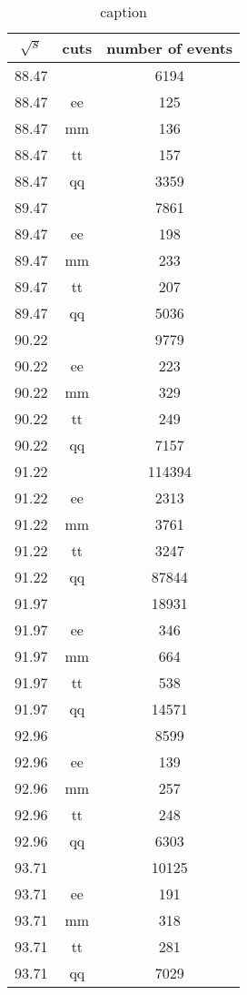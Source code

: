 \begin{table}[htpb]
	\centering
\begin{tabular}{ccc}
	\toprule
	$\sqrt{s}$ &  cuts &  number of events\\
	\midrule
\num{88.47} &   & \num{ 6194}\\
\num{88.47} &  ee & \num{ 125}\\
\num{88.47} &  mm & \num{ 136}\\
\num{88.47} &  tt & \num{ 157}\\
\num{88.47} &  qq & \num{ 3359}\\
\num{89.47} &   & \num{ 7861}\\
\num{89.47} &  ee & \num{ 198}\\
\num{89.47} &  mm & \num{ 233}\\
\num{89.47} &  tt & \num{ 207}\\
\num{89.47} &  qq & \num{ 5036}\\
\num{90.22} &   & \num{ 9779}\\
\num{90.22} &  ee & \num{ 223 }\\
\num{90.22} &  mm & \num{ 329}\\
\num{90.22} &  tt & \num{ 249}\\
\num{90.22} &  qq & \num{ 7157}\\
\num{91.22} &   & \num{ 114394}\\
\num{91.22} &  ee & \num{ 2313}\\
\num{91.22} &  mm & \num{ 3761}\\
\num{91.22} &  tt & \num{ 3247}\\
\num{91.22} &  qq & \num{ 87844}\\
\num{91.97} &   & \num{ 18931}\\
\num{91.97} &  ee & \num{ 346}\\
\num{91.97} &  mm & \num{ 664}\\
\num{91.97} &  tt & \num{ 538}\\
\num{91.97} &  qq & \num{ 14571}\\
\num{92.96} &   & \num{ 8599}\\
\num{92.96} &  ee & \num{ 139}\\
\num{92.96} &  mm & \num{ 257}\\
\num{92.96} &  tt & \num{ 248}\\
\num{92.96} &  qq & \num{ 6303}\\
\num{93.71} &   & \num{ 10125}\\
\num{93.71} &  ee & \num{ 191}\\
\num{93.71} &  mm & \num{ 318}\\
\num{93.71} &  tt & \num{ 281}\\
\num{93.71} &  qq & \num{ 7029}\\
\bottomrule
\end{tabular}
	\caption{caption}
	\label{tab:label}
\end{table}
